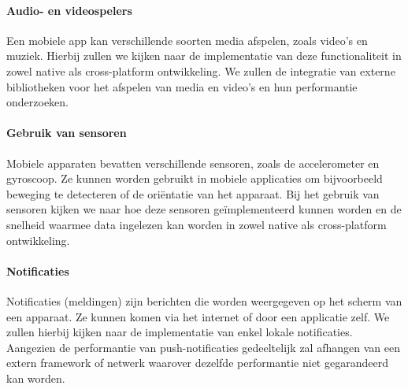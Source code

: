 \paragraph{Audio- en videospelers}
Een mobiele app kan verschillende soorten media afspelen, zoals video's en muziek. 
Hierbij zullen we kijken naar de implementatie van deze functionaliteit in 
zowel native als cross-platform ontwikkeling. We zullen de integratie van externe bibliotheken 
voor het afspelen van media en video's en hun performantie onderzoeken.

\paragraph{Gebruik van sensoren}
Mobiele apparaten bevatten verschillende sensoren, zoals de accelerometer en gyroscoop. 
Ze kunnen worden gebruikt in mobiele applicaties om bijvoorbeeld beweging te detecteren 
of de oriëntatie van het apparaat. Bij het gebruik van sensoren kijken we naar hoe deze 
sensoren geïmplementeerd kunnen worden en de snelheid waarmee data ingelezen kan worden 
in zowel native als cross-platform ontwikkeling.

\paragraph{Notificaties}
Notificaties (meldingen) zijn berichten die worden weergegeven op het scherm van een 
apparaat. Ze kunnen komen via het internet of door een applicatie zelf. We zullen hierbij 
kijken naar de implementatie van enkel lokale notificaties. Aangezien de performantie van 
push-notificaties gedeeltelijk zal afhangen van een extern framework of netwerk waarover 
dezelfde performantie niet gegarandeerd kan worden.


